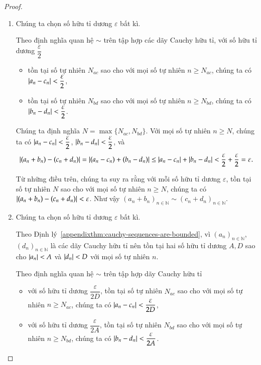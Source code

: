 \begin{proof}
    \begin{enumerate}[label={(\roman*)}]
        \item Chúng ta chọn số hữu tỉ dương $\varepsilon$ bất kì.

              Theo định nghĩa quan hệ $\sim$ trên tập hợp các dãy Cauchy hữu tỉ, với số hữu tỉ dương $\dfrac{\varepsilon}{2}$
              \begin{itemize}[topsep=0pt]
                  \item tồn tại số tự nhiên $N_{ac}$ sao cho với mọi số tự nhiên $n\geq N_{ac}$, chúng ta có $\left\vert{a_{n} - c_{n}}\right\vert < \dfrac{\varepsilon}{2}$,
                  \item tồn tại số tự nhiên $N_{bd}$ sao cho với mọi số tự nhiên $n\geq N_{bd}$, chúng ta có $\left\vert{b_{n} - d_{n}}\right\vert < \dfrac{\varepsilon}{2}$.
              \end{itemize}

              Chúng ta định nghĩa $N = \max\{ N_{ac}, N_{bd} \}$. Với mọi số tự nhiên $n\geq N$, chúng ta có $\left\vert{a_{n} - c_{n}}\right\vert < \dfrac{\varepsilon}{2}$, $\left\vert{b_{n} - d_{n}}\right\vert < \dfrac{\varepsilon}{2}$, và
              \[
                  \left\vert{(a_{n} + b_{n}) - (c_{n} + d_{n})}\right\vert = \left\vert{(a_{n} - c_{n}) + (b_{n} - d_{n})}\right\vert \leq \left\vert{a_{n} - c_{n}}\right\vert + \left\vert{b_{n} - d_{n}}\right\vert < \frac{\varepsilon}{2} + \frac{\varepsilon}{2} = \varepsilon.
              \]

              Từ những điều trên, chúng ta suy ra rằng với mỗi số hữu tỉ dương $\varepsilon$, tồn tại số tự nhiên $N$ sao cho với mọi số tự nhiên $n\geq N$, chúng ta có $\left\vert{(a_{n} + b_{n}) - (c_{n} + d_{n})}\right\vert < \varepsilon$. Như vậy ${(a_{n} + b_{n})}_{n\in\mathbb{N}} \sim {(c_{n} + d_{n})}_{n\in\mathbb{N}}$.
        \item Chúng ta chọn số hữu tỉ dương $\varepsilon$ bất kì.

              Theo Định lý~\ref{appendixthm:cauchy-sequences-are-bounded}, vì ${(a_{n})}_{n\in\mathbb{N}}$, ${(d_{n})}_{n\in\mathbb{N}}$ là các dãy Cauchy hữu tỉ nên tồn tại hai số hữu tỉ dương $A, D$ sao cho $\left\vert{a_{n}}\right\vert < A$ và $\left\vert{d_{n}}\right\vert < D$ với mọi số tự nhiên $n$.

              Theo định nghĩa quan hệ $\sim$ trên tập hợp dãy Cauchy hữu tỉ
              \begin{itemize}
                  \item với số hữu tỉ dương $\dfrac{\varepsilon}{2D}$, tồn tại số tự nhiên $N_{ac}$ sao cho với mọi số tự nhiên $n\geq N_{ac}$, chúng ta có $\left\vert{a_{n} - c_{n}}\right\vert < \dfrac{\varepsilon}{2D}$,
                  \item với số hữu tỉ dương $\dfrac{\varepsilon}{2A}$, tồn tại số tự nhiên $N_{bd}$ sao cho với mọi số tự nhiên $n\geq N_{bd}$, chúng ta có $\left\vert{b_{n} - d_{n}}\right\vert < \dfrac{\varepsilon}{2A}$.
              \end{itemize}


\end{enumerate}
\end{proof}
